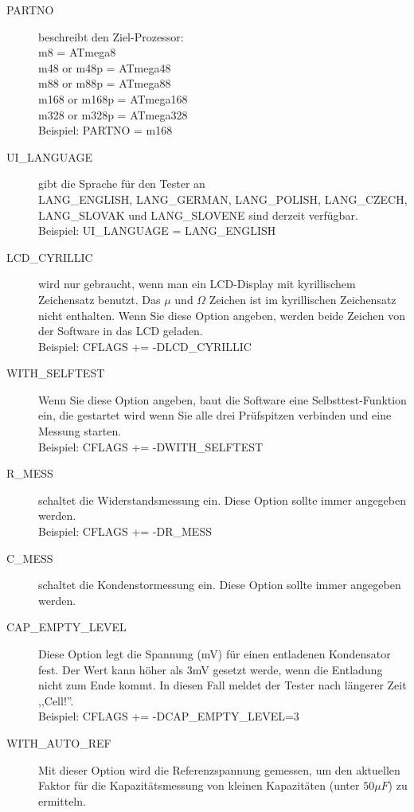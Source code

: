 \begin{description}
  \item[PARTNO] beschreibt den Ziel-Prozessor:\\
         m8 = ATmega8\\
         m48 or m48p = ATmega48\\
         m88 or m88p = ATmega88\\
         m168 or m168p = ATmega168\\
         m328 or m328p = ATmega328\\
    Beispiel:  PARTNO = m168
  \item[UI\_LANGUAGE] gibt die Sprache f\"ur den Tester an\\
    LANG\_ENGLISH, LANG\_GERMAN, LANG\_POLISH, LANG\_CZECH,  LANG\_SLOVAK und  LANG\_SLOVENE sind derzeit verf\"ugbar.\\
    Beispiel: UI\_LANGUAGE = LANG\_ENGLISH
  \item[LCD\_CYRILLIC] wird nur gebraucht, wenn man ein LCD-Display mit kyrillischem Zeichensatz benutzt.
Das \(\mu\) und \(\Omega\) Zeichen ist im kyrillischen Zeichensatz nicht enthalten.
Wenn Sie diese Option angeben, werden beide Zeichen von der Software in das LCD geladen.\\
Beispiel: CFLAGS += -DLCD\_CYRILLIC
  \item[WITH\_SELFTEST] Wenn Sie diese Option angeben, baut die Software eine Selbsttest-Funktion ein, die gestartet wird
wenn Sie alle drei Pr\"ufspitzen verbinden und eine Messung starten.\\
Beispiel: CFLAGS += -DWITH\_SELFTEST
  \item[R\_MESS] schaltet die Widerstandsmessung ein.
 Diese Option sollte immer angegeben werden.\\
Beispiel: CFLAGS += -DR\_MESS
  \item[C\_MESS] schaltet die Kondenstormessung ein.
 Diese Option sollte immer angegeben werden.\\
  \item[CAP\_EMPTY\_LEVEL] Diese Option legt die Spannung (mV) für einen entladenen Kondensator fest.
Der Wert kann höher als 3mV gesetzt werde, wenn die Entladung nicht zum Ende kommt. In diesen Fall meldet der Tester nach längerer Zeit ,,Cell!''.\\
Beispiel: CFLAGS += -DCAP\_EMPTY\_LEVEL=3
  \item[WITH\_AUTO\_REF] Mit dieser Option wird die Referenzspannung gemessen, um den aktuellen Faktor f\"ur die Kapazit\"atsmessung 
von kleinen Kapazit\"aten (unter \(50\mu F\)) zu ermitteln.\\

\end{description}

